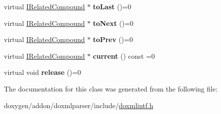 \begin{DoxyCompactItemize}
virtual \mbox{\hyperlink{class_i_related_compound}{I\+Related\+Compound}} $\ast$ {\bfseries to\+Last} ()=0
\item 
\mbox{\label{class_i_related_compound_iterator_ae198441bd33badf5142fdc9850161267}} 
virtual \mbox{\hyperlink{class_i_related_compound}{I\+Related\+Compound}} $\ast$ {\bfseries to\+Next} ()=0
\item 
\mbox{\label{class_i_related_compound_iterator_a0287a7b4d94792470278e6db8b2cd415}} 
virtual \mbox{\hyperlink{class_i_related_compound}{I\+Related\+Compound}} $\ast$ {\bfseries to\+Prev} ()=0
\item 
\mbox{\label{class_i_related_compound_iterator_ac34e174fb8e4b9c9e7662f96dd200b42}} 
virtual \mbox{\hyperlink{class_i_related_compound}{I\+Related\+Compound}} $\ast$ {\bfseries current} () const =0
\item 
\mbox{\label{class_i_related_compound_iterator_ac991fc1437ed3d6a4a70d397d8252f23}} 
virtual void {\bfseries release} ()=0
\end{DoxyCompactItemize}


The documentation for this class was generated from the following file\+:\begin{DoxyCompactItemize}
\item 
doxygen/addon/doxmlparser/include/\mbox{\hyperlink{include_2doxmlintf_8h}{doxmlintf.\+h}}\end{DoxyCompactItemize}
